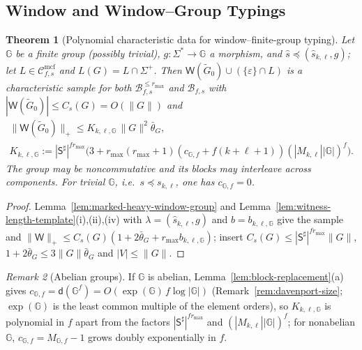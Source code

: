 \documentclass[11pt]{article}
\numberwithin{equation}{section}
\theoremstyle{plain}
\newtheorem{theorem}{Theorem}[section]
\theoremstyle{definition}
\theoremstyle{remark}
\newtheorem{remark}[theorem]{Remark}
\newcommand{\Wit}{\mathsf{W}}
\newcommand{\Cmcf}[2]{\mathcal{C}^{\mathrm{mcf}}_{#1,#2}}
\newcommand{\eps}{\varepsilon}
\begin{document}
\subsection{Window and Window--Group Typings}
\label{subsec:boundary-polydata}

\begin{theorem}[Polynomial characteristic data for window--finite-group typing]
\label{thm:window-group-polydata}
Let ${\mathbb G}$ be a finite group (possibly trivial), $g:\Sigma^*\to {\mathbb G}$ a morphism, and
$\widehat s\preceq(\widehat s_{k,\ell},g)$; let $L\in\Cmcf{f}{s}$ and
$L(G)=L\cap\Sigma^+$.  Then $\Wit(\widetilde G_0)\cup(\{\eps\}\cap L)$ is a
characteristic sample for both $\mathcal B^{\le r_{\max}}_{f,s}$ and
$\mathcal B_{f,s}$ with $|\Wit(\widetilde G_0)|\le C_s(G)=O(\|G\|)$ and
\[
 \begin{gathered}
 \|\Wit(\widetilde G_0)\|_+\le K_{k,\ell,{\mathbb G}}\,\|G\|^2\bar\theta_G,\\
 K_{k,\ell,{\mathbb G}}:=|\mathsf S^\sharp|^{fr_{\max}}
 \bigl(3+r_{\max}(r_{\max}+1)(c_{{\mathbb G},f}+f(k+\ell+1))(|M_{k,\ell}||{\mathbb G}|)^f\bigr).
 \end{gathered}
\]
The group may be noncommutative and its blocks may interleave across components.
For trivial ${\mathbb G}$, i.e.\ $s\preceq s_{k,\ell}$, one has $c_{{\mathbb G},f}=0$.
\end{theorem}

\begin{proof}
Lemma~\ref{lem:marked-heavy-window-group} and
Lemma~\ref{lem:witness-length-template}(i),(ii),(iv) with
$\lambda=(\widehat s_{k,\ell},g)$ and $b=b_{k,\ell,{\mathbb G}}$ give the sample and
$\|\Wit\|_+\le C_s(G)(1+2\bar\theta_G+r_{\max}b_{k,\ell,{\mathbb G}})$; insert
$C_s(G)\le|\mathsf S^\sharp|^{fr_{\max}}\|G\|$, $1+2\bar\theta_G\le3\|G\|\bar\theta_G$ and
$|V|\le\|G\|$.
\end{proof}

\begin{remark}[Abelian groups]
\label{rem:window-abelian}
If ${\mathbb G}$ is abelian, Lemma~\ref{lem:block-replacement}(a) gives
$c_{{\mathbb G},f}=\mathsf d({\mathbb G}^f)=O(\exp({\mathbb G})\,f\log|{\mathbb G}|)$
(Remark~\ref{rem:davenport-size}; $\exp({\mathbb G})$ is the least common multiple of
the element orders), so $K_{k,\ell,{\mathbb G}}$ is polynomial in $f$ apart from the factors
$|\mathsf S^\sharp|^{fr_{\max}}$ and $(|M_{k,\ell}||{\mathbb G}|)^f$; for nonabelian
${\mathbb G}$, $c_{{\mathbb G},f}=M_{{\mathbb G},f}-1$ grows doubly exponentially in $f$.
\end{remark}
\end{document}

